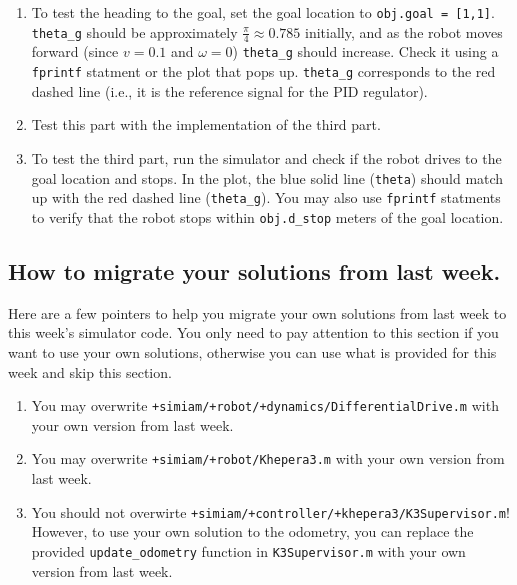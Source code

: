 \documentclass[10pt]{article}
\begin{document}
\begin{enumerate}
  \item To test the heading to the goal, set the goal location to \texttt{obj.goal = [1,1]}. \texttt{theta\_g} should be approximately $\frac{\pi}{4} \approx 0.785$ initially, and as the robot moves forward (since $v=0.1$ and $\omega=0$) \texttt{theta\_g} should increase. Check it using a \texttt{fprintf} statment or the plot that pops up. \texttt{theta\_g} corresponds to the red dashed line (i.e., it is the reference signal for the PID regulator).
  \item Test this part with the implementation of the third part.
  \item To test the third part, run the simulator and check if the robot drives to the goal location and stops. In the plot, the blue solid line (\texttt{theta}) should match up with the red dashed line (\texttt{theta\_g}). You may also use \texttt{fprintf} statments to verify that the robot stops within \texttt{obj.d\_stop} meters of the goal location.
\end{enumerate}

\subsection*{How to migrate your solutions from last week.}

Here are a few pointers to help you migrate your own solutions from last week to this week's simulator code. You only need to pay attention to this section if you want to use your own solutions, otherwise you can use what is provided for this week and skip this section.

\begin{enumerate}
 \item You may overwrite \texttt{+simiam/+robot/+dynamics/DifferentialDrive.m} with your own version from last week.
 \item You may overwrite \texttt{+simiam/+robot/Khepera3.m} with your own version from last week.
 \item You should not overwirte \texttt{+simiam/+controller/+khepera3/K3Supervisor.m}! However, to use your own solution to the odometry, you can replace the provided \texttt{update\_odometry} function in \texttt{K3Supervisor.m} with your own version from last week.
\end{enumerate}
\end{document}
